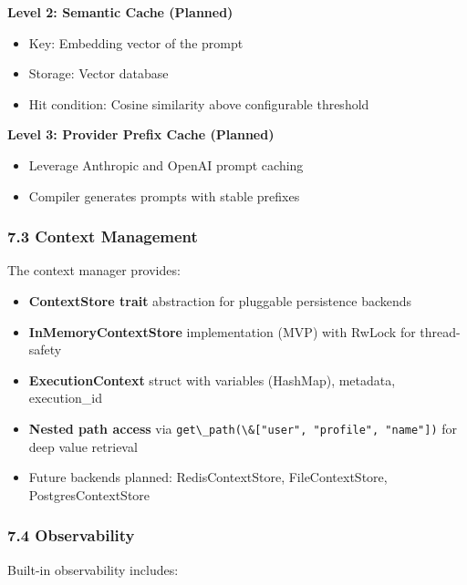 \documentclass[
]{article}
\newcommand{\passthrough}[1]{#1}
\providecommand{\tightlist}{%
  \setlength{\itemsep}{0pt}\setlength{\parskip}{0pt}}
\begin{document}
\textbf{Level 2: Semantic Cache (Planned)}

\begin{itemize}
\tightlist
\item
  Key: Embedding vector of the prompt
\item
  Storage: Vector database
\item
  Hit condition: Cosine similarity above configurable threshold
\end{itemize}

\textbf{Level 3: Provider Prefix Cache (Planned)}

\begin{itemize}
\tightlist
\item
  Leverage Anthropic and OpenAI prompt caching
\item
  Compiler generates prompts with stable prefixes
\end{itemize}

\subsubsection{7.3 Context Management}\label{context-management}

The context manager provides:

\begin{itemize}
\tightlist
\item
  \textbf{ContextStore trait} abstraction for pluggable persistence
  backends
\item
  \textbf{InMemoryContextStore} implementation (MVP) with RwLock for
  thread-safety
\item
  \textbf{ExecutionContext} struct with variables (HashMap), metadata,
  execution\_id
\item
  \textbf{Nested path access} via
  \passthrough{\lstinline!get\_path(\&["user", "profile", "name"])!} for
  deep value retrieval
\item
  Future backends planned: RedisContextStore, FileContextStore,
  PostgresContextStore
\end{itemize}

\subsubsection{7.4 Observability}\label{observability}

Built-in observability includes:
\end{document}
